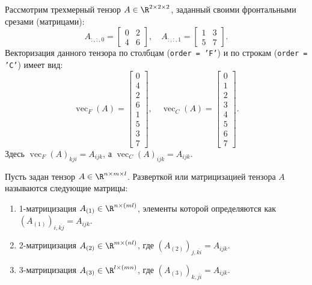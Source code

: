 \begin{tcbexample}
\label{ex:vectorization}
    Рассмотрим трехмерный тензор $A \in \R^{2 \times 2 \times 2}$, заданный своими фронтальными срезами (матрицами):
    \[
        A_{:,:,0} = \begin{bmatrix} 0 & 2 \\ 4 & 6 \end{bmatrix}, \quad
        A_{:,:,1} = \begin{bmatrix} 1 & 3 \\ 5 & 7 \end{bmatrix}.
    \]
    Векторизация данного тензора по столбцам (\texttt{order = 'F'}) и по строкам (\texttt{order = 'C'}) имеет вид:
    \[
        \operatorname{vec}_F(A) = \begin{bmatrix} 0 \\ 4 \\ 2 \\ 6 \\ 1 \\ 5 \\ 3 \\ 7 \end{bmatrix}, \quad
        \operatorname{vec}_C(A) = \begin{bmatrix} 0 \\ 1 \\ 2 \\ 3 \\ 4 \\ 5 \\ 6 \\ 7 \end{bmatrix}.
    \]
    Здесь $\operatorname{vec}_F(A)_{kji} = A_{ijk}$, а $\operatorname{vec}_C(A)_{ijk} = A_{ijk}$.
\end{tcbexample}

\begin{tcbdefinition}
\label{def:matricization}
    Пусть задан тензор $A \in \R^{n \times m \times l}$. Разверткой или матрицизацией тензора $A$ называются следующие матрицы:
    \begin{enumerate}
        \item 1-матрицизация $A_{(1)} \in \R^{n \times (ml)}$, элементы которой определяются как $(A_{(1)})_{i, \overline{kj}} = A_{ijk}$.
        \item 2-матрицизация $A_{(2)} \in \R^{m \times (nl)}$, где $(A_{(2)})_{j, \overline{ki}} = A_{ijk}$.
        \item 3-матрицизация $A_{(3)} \in \R^{l \times (mn)}$, где $(A_{(3)})_{k, \overline{ji}} = A_{ijk}$.
    \end{enumerate}
\end{tcbdefinition}

